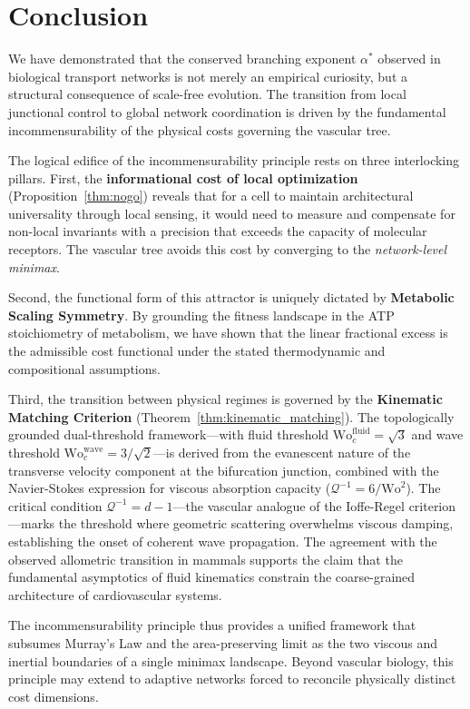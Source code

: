 \section{Conclusion}

We have demonstrated that the conserved branching exponent $\alpha^*$ observed
in biological transport networks is not merely an empirical curiosity, but a
structural consequence of scale-free evolution. The transition from local
junctional control to global network coordination is driven by the
fundamental incommensurability of the physical costs governing the vascular
tree.

The logical edifice of the incommensurability principle rests on three
interlocking pillars. First, the \textbf{informational cost of local
optimization} (Proposition~\ref{thm:nogo}) reveals that for a cell to maintain
architectural universality through local sensing, it would need to measure and
compensate for non-local invariants with a precision that exceeds the capacity
of molecular receptors. The vascular tree avoids this cost by converging to the
\emph{network-level minimax}.

Second, the functional form of this attractor is uniquely dictated by
\textbf{Metabolic Scaling Symmetry}. By grounding the fitness landscape in the
ATP stoichiometry of metabolism, we have shown that the linear fractional excess
is the admissible cost functional under the stated thermodynamic and
compositional assumptions.

Third, the transition between physical regimes is governed by the
\textbf{Kinematic Matching Criterion} (Theorem~\ref{thm:kinematic_matching}).
The topologically grounded dual-threshold framework---with fluid threshold
$\mathrm{Wo}_c^{\mathrm{fluid}} = \sqrt{3}$ and wave threshold
$\mathrm{Wo}_c^{\mathrm{wave}} = 3/\sqrt{2}$---is derived from the evanescent
nature of the transverse velocity component at the bifurcation junction,
combined with the Navier-Stokes expression for viscous absorption capacity
($\mathcal{Q}^{-1} = 6/\mathrm{Wo}^2$). The critical condition $\mathcal{Q}^{-1}
= d-1$---the vascular analogue of the Ioffe-Regel criterion---marks the
threshold where geometric scattering overwhelms viscous damping, establishing
the onset of coherent wave propagation. The agreement with the observed
allometric transition in mammals supports the claim that the fundamental
asymptotics of fluid kinematics constrain the coarse-grained architecture of
cardiovascular systems.

The incommensurability principle thus provides a unified framework that subsumes
Murray's Law and the area-preserving limit as the two viscous and inertial
boundaries of a single minimax landscape. Beyond vascular biology, this
principle may extend to adaptive networks forced to reconcile physically
distinct cost dimensions.

